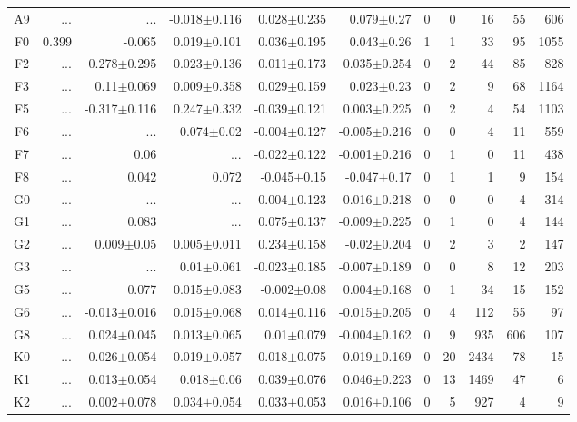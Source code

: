 \begin{table}[t]
\begin{table}[t]
\begin{center}
\begin{tabular}{c|rrrrr|rrrrr}
    A9	&	 ...	&	 ...	&	-0.018$\pm$0.116	&	0.028$\pm$0.235	&	0.079$\pm$0.27	&	0	&	0	&	16	&	55	&	606	\\
    F0	&	0.399	&	-0.065	&	0.019$\pm$0.101	&	0.036$\pm$0.195	&	0.043$\pm$0.26	&	1	&	1	&	33	&	95	&	1055	\\
    F2	&	 ...	&	0.278$\pm$0.295	&	0.023$\pm$0.136	&	0.011$\pm$0.173	&	0.035$\pm$0.254	&	0	&	2	&	44	&	85	&	828	\\
    F3	&	 ...	&	0.11$\pm$0.069	&	0.009$\pm$0.358	&	0.029$\pm$0.159	&	0.023$\pm$0.23	&	0	&	2	&	9	&	68	&	1164	\\
    F5	&	 ...	&	-0.317$\pm$0.116	&	0.247$\pm$0.332	&	-0.039$\pm$0.121	&	0.003$\pm$0.225	&	0	&	2	&	4	&	54	&	1103	\\
    F6	&	 ...	&	 ...	&	0.074$\pm$0.02	&	-0.004$\pm$0.127	&	-0.005$\pm$0.216	&	0	&	0	&	4	&	11	&	559	\\
    F7	&	 ...	&	0.06	&	 ...	&	-0.022$\pm$0.122	&	-0.001$\pm$0.216	&	0	&	1	&	0	&	11	&	438	\\
    F8	&	 ...	&	0.042	&	0.072	&	-0.045$\pm$0.15	&	-0.047$\pm$0.17	&	0	&	1	&	1	&	9	&	154	\\
    G0	&	 ...	&	 ...	&	 ...	&	0.004$\pm$0.123	&	-0.016$\pm$0.218	&	0	&	0	&	0	&	4	&	314	\\
    G1	&	 ...	&	0.083	&	 ...	&	0.075$\pm$0.137	&	-0.009$\pm$0.225	&	0	&	1	&	0	&	4	&	144	\\
    G2	&	 ...	&	0.009$\pm$0.05	&	0.005$\pm$0.011	&	0.234$\pm$0.158	&	-0.02$\pm$0.204	&	0	&	2	&	3	&	2	&	147	\\
    G3	&	 ...	&	 ...	&	0.01$\pm$0.061	&	-0.023$\pm$0.185	&	-0.007$\pm$0.189	&	0	&	0	&	8	&	12	&	203	\\
    G5	&	 ...	&	0.077	&	0.015$\pm$0.083	&	-0.002$\pm$0.08	&	0.004$\pm$0.168	&	0	&	1	&	34	&	15	&	152	\\
    G6	&	 ...	&	-0.013$\pm$0.016	&	0.015$\pm$0.068	&	0.014$\pm$0.116	&	-0.015$\pm$0.205	&	0	&	4	&	112	&	55	&	97	\\
    G8	&	 ...	&	0.024$\pm$0.045	&	0.013$\pm$0.065	&	0.01$\pm$0.079	&	-0.004$\pm$0.162	&	0	&	9	&	935	&	606	&	107	\\
    K0	&	 ...	&	0.026$\pm$0.054	&	0.019$\pm$0.057	&	0.018$\pm$0.075	&	0.019$\pm$0.169	&	0	&	20	&	2434	&	78	&	15	\\
    K1	&	 ...	&	0.013$\pm$0.054	&	0.018$\pm$0.06	&	0.039$\pm$0.076	&	0.046$\pm$0.223	&	0	&	13	&	1469	&	47	&	6	\\
    K2	&	 ...	&	0.002$\pm$0.078	&	0.034$\pm$0.054	&	0.033$\pm$0.053	&	0.016$\pm$0.106	&	0	&	5	&	927	&	4	&	9	\\

\end{tabular}
\end{center}
\end{table}
\end{table}
